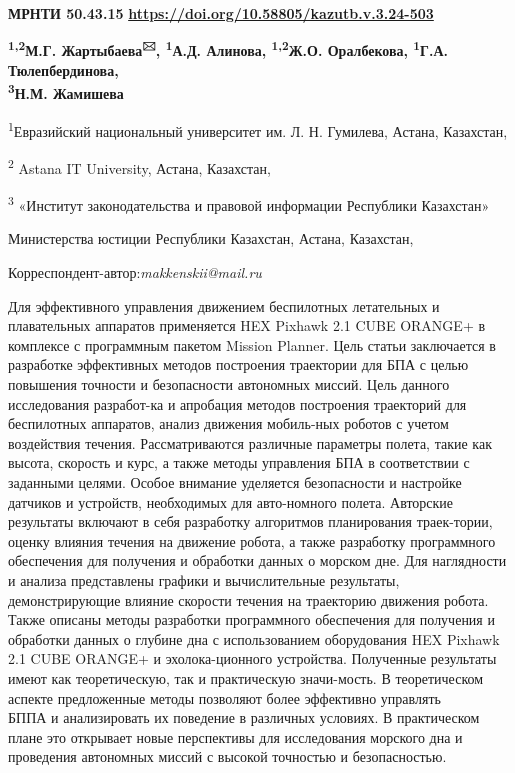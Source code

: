 \newpage
{\bfseries МРНТИ 50.43.15}
\hfill {\bfseries \href{https://doi.org/10.58805/kazutb.v.3.24-503}{https://doi.org/10.58805/kazutb.v.3.24-503}}


\begin{center}
{\bfseries \textsuperscript{1,2}М.Г. Жартыбаева\textsuperscript{🖂},
\textsuperscript{1}А.Д. Алинова, \textsuperscript{1,2}Ж.О. Оралбекова,
\textsuperscript{1}Г.А. Тюлепбердинова,\\
\textsuperscript{3}Н.М. Жамишева}

\textsuperscript{1}Евразийский национальный университет им. Л. Н.
Гумилева, Астана, Казахстан,

\textsuperscript{2} Astana IT University, Астана, Казахстан,

\textsuperscript{3} «Институт законодательства и правовой информации
Республики Казахстан»

Министерства юстиции Республики Казахстан, Астана, Казахстан,

\end{center}
Корреспондент-автор:\emph{makkenskii@mail.ru}\vspace{0.5cm}

Для эффективного управления движением беспилотных летательных и
плавательных аппаратов применяется HEX Pixhawk 2.1 CUBE ORANGE+ в
комплексе с программным пакетом Mission Planner. Цель статьи заключается
в разработке эффективных методов построения траектории для БПА с целью
повышения точности и безопасности автономных миссий. Цель данного
исследования разработ-ка и апробация методов построения траекторий для
беспилотных аппаратов, анализ движения мобиль-ных роботов с учетом
воздействия течения. Рассматриваются различные параметры полета, такие
как высота, скорость и курс, а также методы управления БПА в
соответствии с заданными целями. Особое внимание уделяется безопасности
и настройке датчиков и устройств, необходимых для авто-номного полета.
Авторские результаты включают в себя разработку алгоритмов планирования
траек-тории, оценку влияния течения на движение робота, а также
разработку программного обеспечения для получения и обработки данных о
морском дне. Для наглядности и анализа представлены графики и
вычислительные результаты, демонстрирующие влияние скорости течения на
траекторию движения робота. Также описаны методы разработки программного
обеспечения для получения и обработки данных о глубине дна с
использованием оборудования HEX Pixhawk 2.1 CUBE ORANGE+ и
эхолока-ционного устройства. Полученные результаты имеют как
теоретическую, так и практическую значи-мость. В теоретическом аспекте
предложенные методы позволяют более эффективно управлять\\БППА и
анализировать их поведение в различных условиях. В практическом плане
это открывает новые перспективы для исследования морского дна и
проведения автономных миссий с высокой точностью и безопасностью.

